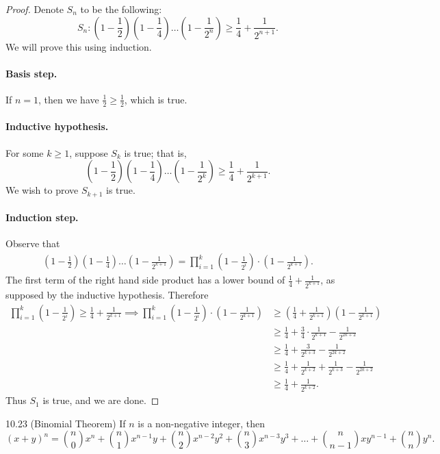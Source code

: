 \documentclass{exam}
\newcommand{\paren}[1]{\left(#1\right)}
\begin{document}
\begin{proof}
    Denote $S_n$ to be the following: $$S_n:\paren{1-\frac12}\paren{1-\frac14}\dots\paren{1-\frac1{2^n}}\ge\frac14+\frac1{2^{n+1}}.$$ We will prove this using induction.

    \paragraph{Basis step.} If $n=1$, then we have $\frac12\ge\frac12$, which is true.

    \paragraph{Inductive hypothesis.} For some $k\ge1$, suppose $S_k$ is true; that is, $$\paren{1-\frac12}\paren{1-\frac14}\dots\paren{1-\frac1{2^k}}\ge\frac14+\frac1{2^{k+1}}.$$ We wish to prove $S_{k+1}$ is true.

    \paragraph{Induction step.} Observe that
    \begin{align*}
        \paren{1-\frac12}\paren{1-\frac14}\dots\paren{1-\frac1{2^{k+1}}}=\prod_{i=1}^k\paren{1-\frac1{2^i}}\cdot\paren{1-\frac1{2^{k+1}}}.
    \end{align*}
    The first term of the right hand side product has a lower bound of $\frac14+\frac1{2^{k+1}}$, as supposed by the inductive hypothesis. Therefore
    \begin{align*}
        \prod_{i=1}^k\paren{1-\frac1{2^i}}\ge\frac14+\frac1{2^{k+1}}\implies\prod_{i=1}^k\paren{1-\frac1{2^i}}\cdot\paren{1-\frac1{2^{k+1}}}&\ge\paren{\frac14+\frac1{2^{k+1}}}\paren{1-\frac1{2^{k+1}}}\\
        &\ge\frac14+\frac34\cdot\frac1{2^{k+1}}-\frac1{2^{2k+2}}\\
        &\ge\frac14+\frac3{2^{k+3}}-\frac1{2^{2k+2}}\\
        &\ge\frac14+\frac1{2^{k+2}}+\frac1{2^{k+3}}-\frac1{2^{2k+2}}\\
        &\ge\frac14+\frac1{2^{k+2}}.
    \end{align*}
    Thus $S_1$ is true, and we are done.
\end{proof}

\begin{proposition}{10.23 (Binomial Theorem)}
    If $n$ is a non-negative integer, then $$(x+y)^n=\binom n 0x^n+\binom n 1x^{n-1}y+\binom n 2x^{n-2}y^2 + \binom n 3x^{n-3}y^3+\dots+\binom{n}{n-1}xy^{n-1}+\binom n ny^n.$$
\end{proposition}
\end{document}
